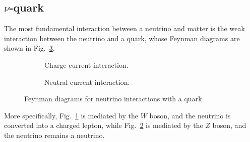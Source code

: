 \subsection{$\nu$-quark}
The most fundamental interaction between a neutrino and matter is the weak interaction between the neutrino and a quark, whose Feynman diagrams are shown in Fig.~\ref{fig:nu-q-feyn}.

\begin{figure}[h]
  \centering
  \begin{subfigure}[b]{0.45\textwidth}
    \centering
    \caption{Charge current interaction.}
    \label{fig:cc-interaction}
  \end{subfigure}
  \hfill
  \begin{subfigure}[b]{0.45\textwidth}
    \centering
    \caption{Neutral current interaction.}
    \label{fig:nc-interaction}
  \end{subfigure}
  \caption{Feynman diagrams for neutrino interactions with a quark.}
  \label{fig:nu-q-feyn}
\end{figure}
More specifically, Fig.~\ref{fig:cc-interaction} is mediated by the $W$ boson, and the neutrino is converted into a charged lepton, while Fig.~\ref{fig:nc-interaction} is mediated by the $Z$ boson, and the neutrino remains a neutrino.
